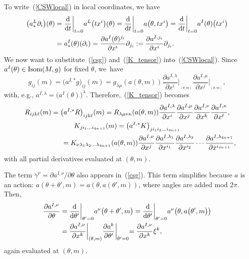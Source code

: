 \documentclass[pdftex]{sigma}
\numberwithin{equation}{section}
\theoremstyle{definition}
\newcommand{\isom}{{\rm Isom}}
\newcommand{\ism}{\isom}
\begin{document}
To write~(\ref{CSWlocal}) in local coordinates, we have
\begin{align}
\bigl(a^L_* \partial_i\bigr)(\theta) &=\frac{{\rm d}}{{\rm d}t}\biggl|_{t=0} a^L\bigl(tx^i\bigr)(\theta) =
\frac{{\rm d}}{{\rm d}t}\biggl|_{t=0} a\bigl(\theta, tx^i\bigr) =
\frac{{\rm d}}{{\rm d}t}\biggl|_{t=0} a^I(\theta)\bigl(tx^i\bigr)\nonumber\\
&= a^I_*(\theta)(\partial_i)
= \frac{\partial a^I(\theta)^{j_i}}{\partial x^i}\partial_{j_i}
:= \frac{\partial a^{I,j_i}}{\partial x^i}\partial_{j_i}.\label{eq:cyan1}
\end{align}
We now want to substitute~(\ref{csg}) and~(\ref{K_tensor}) into~(\ref{CSWlocal}). Since $a^I(\theta)\in \ism(M,g)$ for fixed $\theta$, we~have
\[ g_{ij}(m) = \bigl(a^{I,*}g\bigr)_{ij}(m) =g_{\lambda\mu}(a(\theta,m)) \frac{\partial a^{I, \lambda}}{\partial x^i}
\biggl|_{_{(\theta,m)}}
\frac{\partial a^{I, \mu}}{\partial x^j}\biggl|_{_{(\theta,m)}},\]
with, e.g., $a^{I,\lambda} = \bigl(a^I(\theta)\bigr)^\lambda$.
Therefore,~(\ref{K_tensor}) becomes
\begin{gather}
R_{ijk\ell}(m) = \bigl(a^{I,*}R\bigr)_{ijk\ell}(m) = R_{\lambda\mu\nu\kappa}(a(\theta,m))
\frac{\partial a^{I, \lambda}}{\partial x^i}\frac{\partial a^{I, \mu}}{\partial x^j}
\frac{\partial a^{I, \nu}}{\partial x^k}\frac{\partial a^{I, \kappa}}{\partial x^{\ell}},\nonumber\\
K_{ji_1\dots i_{4n+1}}(m)
=\bigl(a^{I,*}K\bigr)_{j i_1 i_2\dots i_{4n+1}} \nonumber\\
 \hphantom{K_{ji_1\dots i_{4n+1}}(m)}{}
 = K_{\nu \lambda_1\lambda_2\dots\lambda_{4n+1}}(a(\theta,m))
{\frac{\partial a^{I,\nu}}{\partial x^j}}
\frac{\partial a^{I, \lambda_1}}{\partial x^{i_1}}\frac{\partial a^{I, \lambda_2}}{\partial x^{i_2}} \cdots
\frac{\partial a^{I, \lambda_{4n+1}}}{\partial x^{i_{4n+1}}},\label{eq:11}
\end{gather}
with all partial derivatives evaluated at $(\theta,m)$.

The term $\dot\gamma^\nu = \partial a^{I,\nu}/\partial\theta$ also appears in~(\ref{csg}).
This term simplifies because $a$ is an action: $a(\theta + \theta',m) =a(\theta,a(\theta',m))$, where angles are added mod $2\pi$. Then,
\begin{align}
\frac{\partial a^{I,\nu}}{\partial\theta} &= \frac{{\rm d}}{{\rm d}\theta'}\biggl|_{\theta'=0}
a^\nu\bigl(\theta+\theta',m\bigr) = \frac{{\rm d}}{{\rm d}\theta'}\biggl|_{\theta'=0} a^\nu\bigl(\theta,a\bigl(\theta',m\bigr)\bigr)
\nonumber\\
&= \frac{\partial a^{I,\nu}}{\partial x^k}\biggl|_{(\theta,m)}\frac{\partial a^k}{\partial \theta'}\biggl|_{\theta'=0}
= \frac{\partial a^{I,\nu}}{\partial x^k}\xi^k,\label{eq:cyan2}
\end{align}
again evaluated at $(\theta,m)$.
\end{document}
